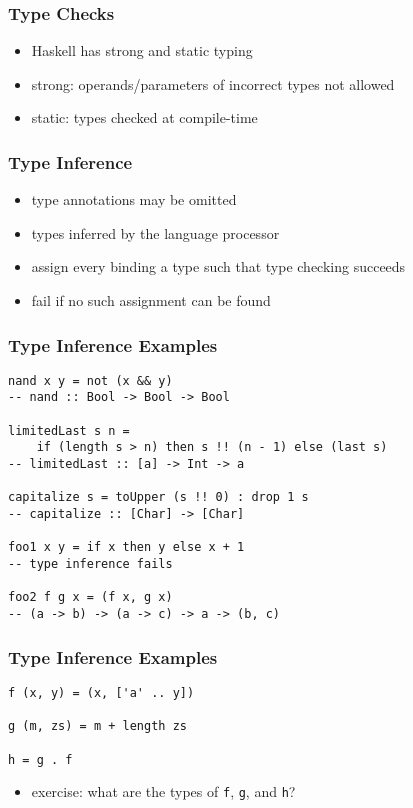 \documentclass[dvipsnames]{beamer}
\theoremstyle{plain}
\begin{document}
\begin{frame}
  \frametitle{Type Checks}

  \begin{itemize}
    \item Haskell has \alert{strong} and \alert{static} typing

    \medskip
    \item strong: operands/parameters of incorrect types not allowed
    \item static: types checked at compile-time
  \end{itemize}
\end{frame}

\begin{frame}
  \frametitle{Type Inference}

  \begin{itemize}
    \item type annotations may be omitted
    \item types inferred by the language processor

    \medskip
    \item assign every binding a type such that type checking succeeds
    \item fail if no such assignment can be found
  \end{itemize}
\end{frame}

\begin{frame}[fragile]
  \frametitle{Type Inference Examples}

  \begin{lstlisting}
nand x y = not (x && y)
-- nand :: Bool -> Bool -> Bool

limitedLast s n =
    if (length s > n) then s !! (n - 1) else (last s)
-- limitedLast :: [a] -> Int -> a

capitalize s = toUpper (s !! 0) : drop 1 s
-- capitalize :: [Char] -> [Char]

foo1 x y = if x then y else x + 1
-- type inference fails

foo2 f g x = (f x, g x)
-- (a -> b) -> (a -> c) -> a -> (b, c)
  \end{lstlisting}

\end{frame}

\begin{frame}[fragile]
  \frametitle{Type Inference Examples}

  \begin{lstlisting}
f (x, y) = (x, ['a' .. y])

g (m, zs) = m + length zs

h = g . f
  \end{lstlisting}

  \medskip
  \begin{itemize}
    \item exercise: what are the types of \lstinline|f|, \lstinline|g|,
      and \lstinline|h|?
  \end{itemize}
\end{frame}
\end{document}
